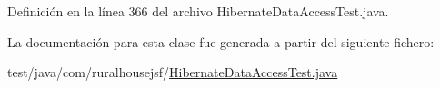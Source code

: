 Definición en la línea 366 del archivo Hibernate\+Data\+Access\+Test.\+java.



La documentación para esta clase fue generada a partir del siguiente fichero\+:\begin{DoxyCompactItemize}
\item 
test/java/com/ruralhousejsf/\mbox{\hyperlink{a00101}{Hibernate\+Data\+Access\+Test.\+java}}\end{DoxyCompactItemize}
